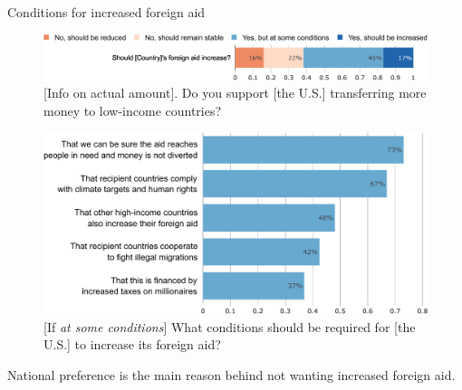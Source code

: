 \documentclass[aspectratio=169,xcolor=dvipsnames, 11pt,mathserif]{beamer}
\begin{document}
\begin{framefont}{\small}
\begin{frame}{Conditions for increased foreign aid \label{foreign_aid_conditions} \hyperlink{other_policies}{}}
    \begin{figure} \vspace{-.2cm}
        \centering 
        \caption{[Info on actual amount]. Do you support [the U.S.] transferring more money to low-income countries?}\vspace{-.2cm}
        \includegraphics[width=.7\textwidth]{../figures/all/foreign_aid_raise_support.pdf} 
    \end{figure}\vspace{-.2cm} \pause
    \begin{figure} 
        \centering 
        \caption{[If \textit{at some conditions}] What conditions should be required for [the U.S.] to increase its foreign aid?}\vspace{-.2cm}
        \includegraphics[height=.48\textheight]{../figures/all/foreign_aid_condition.pdf} 
    \end{figure} \pause \vspace{-.3cm}
	\bbvs \ip {}%
	\ip National preference is the main reason behind not wanting increased foreign aid.
	\ee 
\end{frame}


\end{framefont}
\end{document}
